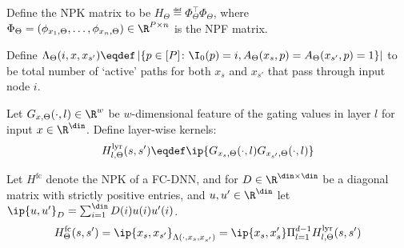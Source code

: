 \begin{definition}
Define the NPK matrix to be  $H_{\Theta}\eqdef\Phi^\top_{\Theta}\Phi_{\Theta}$, where $\Phi_{\Theta}=(\phi_{x_1,\Theta},\ldots,\phi_{x_n,\Theta})\in\R^{P\times n}$ is the NPF matrix.
\end{definition}
\begin{comment}
As a result, it turns out that, depending on the network architecture, the NPK has interesting structure/form. In FC-DNN, the NPK involves product of base kernels (\Cref{def:layerkernel},\Cref{lm:productkernel}) corresponding to the binary gating features of the various layers. In ResNet with $b$ skip connections there are $2^b$ sub-FC-DNNs and the NPK is a sum of the NPKs of these sub-FC-DNNs (\Cref{lm:sumofproduct}). Further, in CNNs due to weight sharing, the NPK has a rotationally invariant form (\Cref{lm:cnnnpk}). In what follows, we define the NPK matrix to be  $H_{\Theta}\eqdef\Phi^\top_{\Theta}\Phi_{\Theta}$, where $\Phi_{\Theta}=(\phi_{x_1,\Theta},\ldots,\phi_{x_n,\Theta})\in\R^{P\times n}$ is the NPF matrix.
\end{comment}
\begin{definition}\label{def:cnnlambda}
 Define $\Lambda_{\Theta}(i,x,x_{s'}) \eqdef \left|\{p\in[P]\colon  \I_0(p)=i, A_{\Theta}(x_s,p)= A_{\Theta}(x_{s'},p)=1\}\right|$ to be total number of `active' paths for both $x_s$ and $x_{s'}$ that pass through input node $i$.
\end{definition}
%
\begin{definition}\label{def:layerkernel} Let $G_{x,\Theta}(\cdot,l)\in\R^w$ be $w$-dimensional feature of the gating values in layer $l$ for input $x\in\R^{\din}$.  Define layer-wise kernels:
\begin{align*}
H^{\text{lyr}}_{l,\Theta}(s,s')\eqdef\ip{G_{x_s,\Theta}(\cdot,l)G_{x_{s'},\Theta}(\cdot,l)}
\end{align*}
\end{definition}
\begin{lemma}\label{lm:productkernel}
 Let $H^{\text{fc}}$ denote the NPK of a FC-DNN, and for $D\in\R^{\din\times\din}$ be a diagonal matrix with strictly positive entries, and $u,u'\in\R^{\din}$ let $\ip{u,u'}_{D}=\sum_{i=1}^{\din}D(i)u(i)u'(i)$.
\begin{align*}
H^{\text{fc}}_{\Theta}(s,s')= \ip{x_s,x_{s'}}_{\Lambda(\cdot,x_s,x_{s'})}=\ip{x_s,x_s'}\Pi_{l=1}^{d-1}H^{\text{lyr}}_{l,\Theta}(s,s')\end{align*}
\end{lemma}
